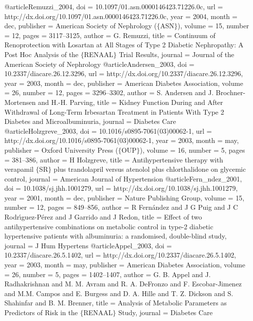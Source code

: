 @article{Remuzzi_2004,
	doi = {10.1097/01.asn.0000146423.71226.0c},
	url = {http://dx.doi.org/10.1097/01.asn.0000146423.71226.0c},
	year = 2004,
	month = {dec},
	publisher = {American Society of Nephrology ($\lbrace$ASN$\rbrace$)},
	volume = {15},
	number = {12},
	pages = {3117--3125},
	author = {G. Remuzzi},
	title = {Continuum of Renoprotection with Losartan at All Stages of Type 2 Diabetic Nephropathy: A Post Hoc Analysis of the $\lbrace$RENAAL$\rbrace$ Trial Results},
	journal = {Journal of the American Society of Nephrology}
}
@article{Andersen_2003,
	doi = {10.2337/diacare.26.12.3296},
	url = {http://dx.doi.org/10.2337/diacare.26.12.3296},
	year = 2003,
	month = {dec},
	publisher = {American Diabetes Association},
	volume = {26},
	number = {12},
	pages = {3296--3302},
	author = {S. Andersen and J. Brochner-Mortensen and H.-H. Parving},
	title = {Kidney Function During and After Withdrawal of Long-Term Irbesartan Treatment in Patients With Type 2 Diabetes and Microalbuminuria},
	journal = {Diabetes Care}
}
@article{Holzgreve_2003,
	doi = {10.1016/s0895-7061(03)00062-1},
	url = {http://dx.doi.org/10.1016/s0895-7061(03)00062-1},
	year = 2003,
	month = {may},
	publisher = {Oxford University Press ($\lbrace$OUP$\rbrace$)},
	volume = {16},
	number = {5},
	pages = {381--386},
	author = {H Holzgreve},
	title = {Antihypertensive therapy with verapamil $\lbrace$SR$\rbrace$ plus trandolapril versus atenolol plus chlorthalidone on glycemic control},
	journal = {American Journal of Hypertension}
}
@article{Fern_ndez_2001,
	doi = {10.1038/sj.jhh.1001279},
	url = {http://dx.doi.org/10.1038/sj.jhh.1001279},
	year = 2001,
	month = {dec},
	publisher = {Nature Publishing Group},
	volume = {15},
	number = {12},
	pages = {849--856},
	author = {R Fern{\'{a}}ndez and J G Puig and J C Rodr{\'{\i}}guez-P{\'{e}}rez and J Garrido and J Redon},
	title = {Effect of two antihypertensive combinations on metabolic control in type-2 diabetic hypertensive patients with albuminuria: a randomised, double-blind study},
	journal = {J Hum Hypertens}
}
@article{Appel_2003,
	doi = {10.2337/diacare.26.5.1402},
	url = {http://dx.doi.org/10.2337/diacare.26.5.1402},
	year = 2003,
	month = {may},
	publisher = {American Diabetes Association},
	volume = {26},
	number = {5},
	pages = {1402--1407},
	author = {G. B. Appel and J. Radhakrishnan and M. M. Avram and R. A. DeFronzo and F. Escobar-Jimenez and M.M. Campos and E. Burgess and D. A. Hille and T. Z. Dickson and S. Shahinfar and B. M. Brenner},
	title = {Analysis of Metabolic Parameters as Predictors of Risk in the $\lbrace$RENAAL$\rbrace$ Study},
	journal = {Diabetes Care}
}
